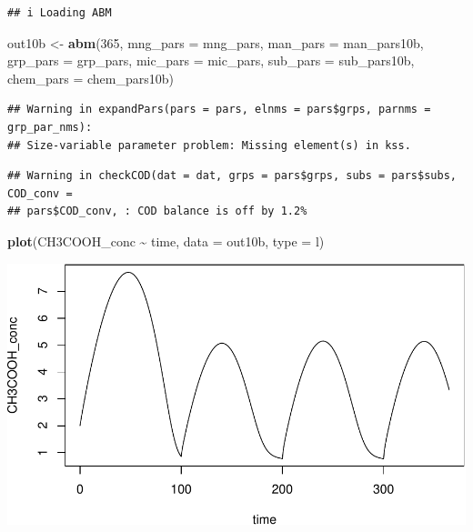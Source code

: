 \documentclass[
]{article}
\newenvironment{Shaded}{\begin{snugshade}}{\end{snugshade}}
\newcommand{\AttributeTok}[1]{\textcolor[rgb]{0.13,0.29,0.53}{#1}}
\newcommand{\DecValTok}[1]{\textcolor[rgb]{0.00,0.00,0.81}{#1}}
\newcommand{\FunctionTok}[1]{\textcolor[rgb]{0.13,0.29,0.53}{\textbf{#1}}}
\newcommand{\NormalTok}[1]{#1}
\newcommand{\OtherTok}[1]{\textcolor[rgb]{0.56,0.35,0.01}{#1}}
\newcommand{\SpecialCharTok}[1]{\textcolor[rgb]{0.81,0.36,0.00}{\textbf{#1}}}
\newcommand{\StringTok}[1]{\textcolor[rgb]{0.31,0.60,0.02}{#1}}
\begin{document}
\begin{verbatim}
## i Loading ABM
\end{verbatim}

\begin{Shaded}
\begin{Highlighting}[]
\NormalTok{out10b }\OtherTok{\textless{}{-}} \FunctionTok{abm}\NormalTok{(}\DecValTok{365}\NormalTok{,}
            \AttributeTok{mng\_pars =}\NormalTok{ mng\_pars,}
            \AttributeTok{man\_pars =}\NormalTok{ man\_pars10b,}
            \AttributeTok{grp\_pars =}\NormalTok{ grp\_pars,}
            \AttributeTok{mic\_pars =}\NormalTok{ mic\_pars,}
            \AttributeTok{sub\_pars =}\NormalTok{ sub\_pars10b,}
            \AttributeTok{chem\_pars =}\NormalTok{ chem\_pars10b)}
\end{Highlighting}
\end{Shaded}

\begin{verbatim}
## Warning in expandPars(pars = pars, elnms = pars$grps, parnms = grp_par_nms):
## Size-variable parameter problem: Missing element(s) in kss.
\end{verbatim}

\begin{verbatim}
## Warning in checkCOD(dat = dat, grps = pars$grps, subs = pars$subs, COD_conv =
## pars$COD_conv, : COD balance is off by 1.2%
\end{verbatim}

\begin{Shaded}
\begin{Highlighting}[]
\FunctionTok{plot}\NormalTok{(CH3COOH\_conc }\SpecialCharTok{\textasciitilde{}}\NormalTok{ time, }\AttributeTok{data =}\NormalTok{ out10b, }\AttributeTok{type =} \StringTok{\textquotesingle{}l\textquotesingle{}}\NormalTok{)}
\end{Highlighting}
\end{Shaded}

\includegraphics{simple_demo_files/figure-latex/unnamed-chunk-82-1.pdf}
\end{document}
